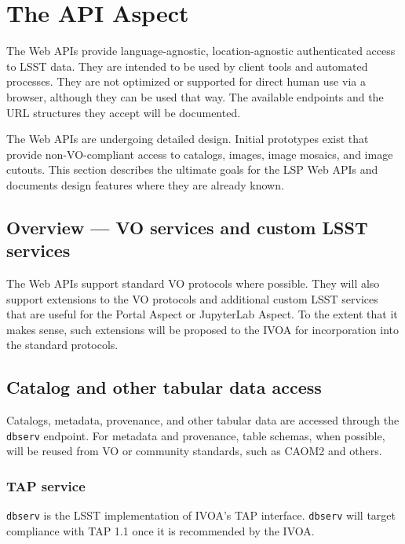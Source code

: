 \section{The API Aspect}\label{api-aspect}

The Web APIs provide language-agnostic, location-agnostic authenticated access
to LSST data.  They are intended to be used by client tools and automated
processes.  They are not optimized or supported for direct human use via a
browser, although they can be used that way.  The available endpoints and the
URL structures they accept will be documented.

The Web APIs are undergoing detailed design.  Initial prototypes exist that
provide non-VO-compliant access to catalogs, images, image mosaics, and image
cutouts.  This section describes the ultimate goals for the LSP Web APIs and
documents design features where they are already known.

\subsection{Overview --- VO services and custom LSST services}\label{api-overview}

The Web APIs support standard VO protocols where possible.  They will also
support extensions to the VO protocols and additional custom LSST services that
are useful for the Portal Aspect or JupyterLab Aspect.  To the extent that it
makes sense, such extensions will be proposed to the IVOA for incorporation
into the standard protocols.

\subsection{Catalog and other tabular data access}\label{catalog-and-other-tabular-data-access}

Catalogs, metadata, provenance, and other tabular data are accessed through the
\texttt{dbserv} endpoint. For metadata and provenance, table schemas, when
possible, will be reused from VO or community standards, such as CAOM2
\citep{CAOM2} and others.

\subsubsection{TAP service}\label{tap-and-other-vo-compliant-services}

\texttt{dbserv} is the LSST implementation of IVOA's TAP interface.
\texttt{dbserv} will target compliance with TAP 1.1 once it is recommended
by the IVOA.

